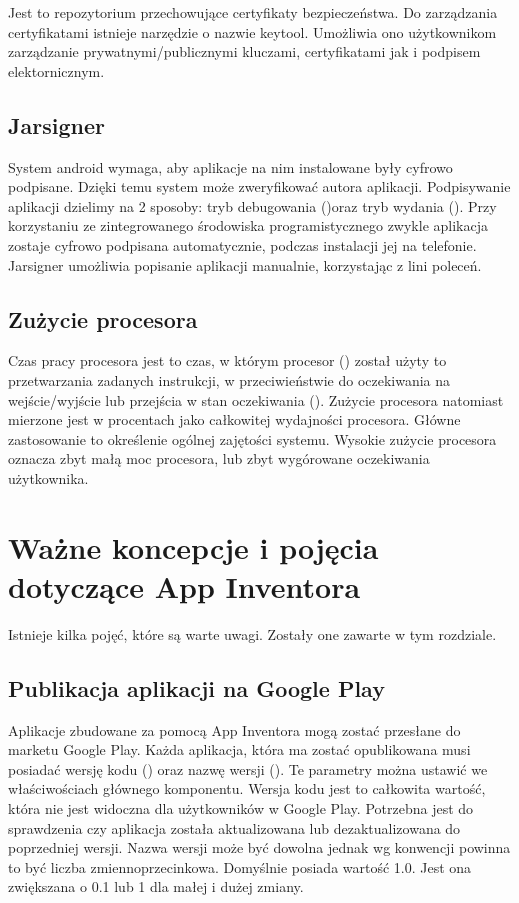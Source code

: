 Jest to repozytorium przechowujące certyfikaty bezpieczeństwa. Do zarządzania certyfikatami istnieje narzędzie o nazwie keytool. Umożliwia ono użytkownikom zarządzanie prywatnymi/publicznymi kluczami, certyfikatami jak i podpisem elektornicznym.\cite{doc:keytool}

\subsection{Jarsigner}

System android wymaga, aby aplikacje na nim instalowane były cyfrowo podpisane. Dzięki temu system może zweryfikować autora aplikacji. Podpisywanie aplikacji dzielimy na 2 sposoby: tryb debugowania ()oraz tryb wydania (). Przy korzystaniu ze zintegrowanego środowiska programistycznego zwykle aplikacja zostaje cyfrowo podpisana automatycznie, podczas instalacji jej na telefonie. Jarsigner umożliwia popisanie aplikacji manualnie, korzystając z lini poleceń.

\subsection{Zużycie procesora}

Czas pracy procesora jest to czas, w którym procesor () został użyty to przetwarzania zadanych instrukcji, w przeciwieństwie do oczekiwania na wejście/wyjście lub przejścia w stan oczekiwania (). Zużycie procesora natomiast mierzone jest w procentach jako całkowitej wydajności procesora. Główne zastosowanie to określenie ogólnej zajętości systemu. Wysokie zużycie procesora oznacza zbyt małą moc procesora, lub zbyt wygórowane oczekiwania użytkownika.


\section{Ważne koncepcje i pojęcia dotyczące App Inventora}

Istnieje kilka pojęć, które są warte uwagi. Zostały one zawarte w tym rozdziale.

\subsection{Publikacja aplikacji na Google Play}

Aplikacje zbudowane za pomocą App Inventora mogą zostać przesłane do marketu Google Play. Każda aplikacja, która ma zostać opublikowana musi posiadać wersję kodu () oraz nazwę wersji (). Te parametry można ustawić we właściwościach głównego komponentu\cite{doc:concepts}. Wersja kodu jest to całkowita wartość, która nie jest widoczna dla użytkowników w Google Play. Potrzebna jest do sprawdzenia czy aplikacja została aktualizowana lub dezaktualizowana do poprzedniej wersji. Nazwa wersji może być dowolna jednak wg konwencji powinna to być liczba zmiennoprzecinkowa. Domyślnie posiada wartość 1.0. Jest ona zwiększana o 0.1 lub 1 dla małej i dużej zmiany.

